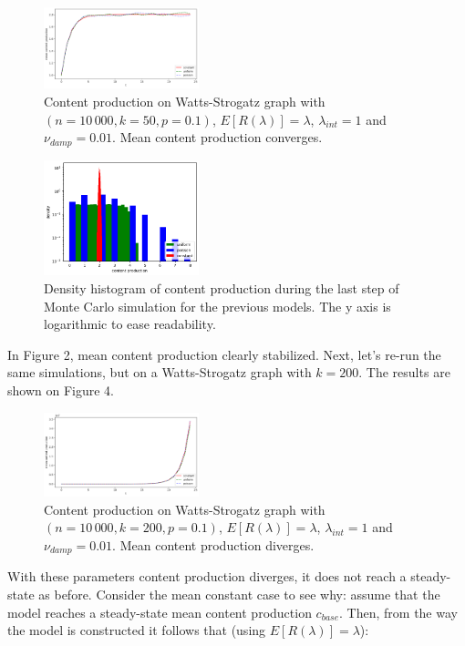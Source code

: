 \documentclass[final,5p,times,twocolumn,authoryear]{elsarticle}
\begin{document}
\begin{figure}[h]
	\centering 
	\includegraphics[width=0.4\textwidth]{figure-2.png}	
	\caption{Content production on Watts-Strogatz graph with $(n=10\,000, k=50, p=0.1)$, $E[R(\lambda)]= \lambda$, $\lambda_{int} = 1$ and $\nu_{damp} = 0.01$. Mean content production converges.} 
\end{figure}

\begin{figure}[h]
	\centering 
	\includegraphics[width=0.4\textwidth]{figure-3.png}	
	\caption{Density histogram of content production during the last step of Monte Carlo simulation for the previous models. The y axis is logarithmic to ease readability.} 
\end{figure}

In Figure 2, mean content production clearly stabilized. Next, let's re-run the same simulations, but on a Watts-Strogatz graph with $k=200$. The results are shown on Figure 4.

\begin{figure}[h]
	\centering 
	\includegraphics[width=0.4\textwidth]{figure-4.png}	
	\caption{Content production on Watts-Strogatz graph with $(n=10\,000, k=200, p=0.1)$, $E[R(\lambda)]= \lambda$, $\lambda_{int} = 1$ and $\nu_{damp} = 0.01$. Mean content production diverges.} 
\end{figure}

With these parameters content production diverges, it does not reach a steady-state as before. Consider the mean constant case  to see why: assume that the model reaches a steady-state mean content production $c_{base}$. Then, from the way the model is constructed it follows that (using $E[R(\lambda)]=\lambda$):
\end{document}

